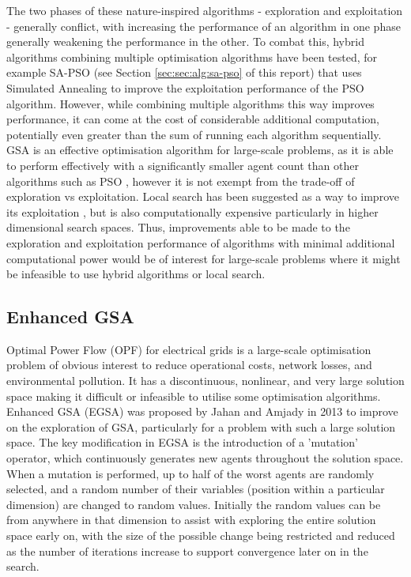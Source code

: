 The two phases of these nature-inspired algorithms - exploration and exploitation - generally conflict, with increasing the performance of an algorithm in one phase generally weakening the performance in the other.
To combat this, hybrid algorithms combining multiple optimisation algorithms have been tested, for example SA-PSO (see Section \ref{sec:sec:alg:sa-pso} of this report) that uses Simulated Annealing to improve the exploitation performance of the PSO algorithm.
However, while combining multiple algorithms this way improves performance, it can come at the cost of considerable additional computation, potentially even greater than the sum of running each algorithm sequentially.
GSA is an effective optimisation algorithm for large-scale problems, as it is able to perform effectively with a significantly smaller agent count than other algorithms such as PSO \cite{EGSA}, however it is not exempt from the trade-off of exploration vs exploitation.
Local search has been suggested as a way to improve its exploitation \cite{GSA}, but is also computationally expensive particularly in higher dimensional search spaces.
Thus, improvements able to be made to the exploration and exploitation performance of algorithms with minimal additional computational power would be of interest for large-scale problems where it might be infeasible to use hybrid algorithms or local search.


\subsection{Enhanced GSA}\label{sec:alg:gsa:egsa}
Optimal Power Flow (OPF) for electrical grids is a large-scale optimisation problem of obvious interest to reduce operational costs, network losses, and environmental pollution.
It has a discontinuous, nonlinear, and very large solution space making it difficult or infeasible to utilise some optimisation algorithms.
Enhanced GSA (EGSA) was proposed by Jahan and Amjady \cite{EGSA} in 2013 to improve on the exploration of GSA, particularly for a problem with such a large solution space.
The key modification in EGSA is the introduction of a 'mutation' operator, which continuously generates new agents throughout the solution space.
When a mutation is performed, up to half of the worst agents are randomly selected, and a random number of their variables (position within a particular dimension) are changed to random values.
Initially the random values can be from anywhere in that dimension to assist with exploring the entire solution space early on, with the size of the possible change being restricted and reduced as the number of iterations increase to support convergence later on in the search.

